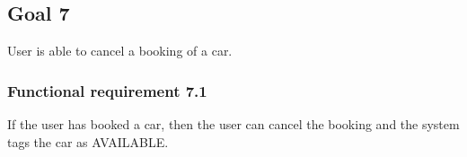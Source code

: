 \subsection{Goal 7}
User is able to cancel a booking of a car.

\setcounter{secnumdepth}{3}
\subsubsection{Functional requirement 7.1}
If the user has booked a car, then the user can cancel the booking and the system tags the car as AVAILABLE.